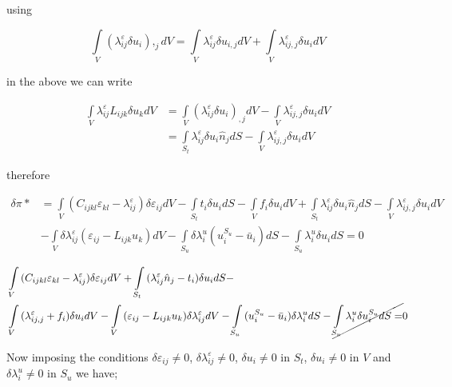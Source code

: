 using

\[\int\limits_V {(\lambda _{ij}^\varepsilon \delta {u_i}){,_j}dV = } \int\limits_V {\lambda _{ij}^\varepsilon \delta {u_{i,j}}dV}  + \int\limits_V {\lambda _{ij,j}^\varepsilon \delta {u_i}dV} \]

in the above we can write

\begin{align*}
\int\limits_V {\lambda _{ij}^\varepsilon {L_{ijk}}\delta {u_k}dV} & = \int\limits_V {{{(\lambda _{ij}^\varepsilon \delta {u_i})}_{,j}}dV}  - \int\limits_V {\lambda _{ij,j}^\varepsilon \delta {u_i}dV}\\
& = \int\limits_{{S_t}} {\lambda _{ij}^\varepsilon \delta {u_i}{{\hat n}_j}dS}  - \int\limits_V {\lambda _{ij,j}^\varepsilon \delta {u_i}dV}
\end{align*}

therefore


\begin{align*}
\delta \pi * &= \int\limits_V {({C_{ijkl}}{\varepsilon _{kl}} - \lambda _{ij}^\varepsilon )\delta {\varepsilon _{ij}}dV - \int\limits_{{S_t}} {{t_i}\delta {u_i}dS}  - \int\limits_V {{f_i}\delta {u_i}dV + } } \int\limits_{{S_t}} {\lambda _{ij}^\varepsilon \delta {u_i}{{\hat n}_j}dS}  - \int\limits_V {\lambda _{ij,j}^\varepsilon \delta {u_i}dV}\\
&- \int\limits_V {\delta \lambda _{ij}^\varepsilon ({\varepsilon _{ij}} - {L_{ijk}}{u_k})dV}  - \int\limits_{{S_u}} {\delta \lambda _i^u(u_i^{{S_u}} - {{\bar u}_i})dS}  - \int\limits_{{S_u}} {\lambda _i^u\delta {u_i}dS}  = 0
\end{align*}


\begin{align*}
&\int\limits_V {({C_{ijkl}}{\varepsilon _{kl}} - \lambda _{ij}^\varepsilon )\delta {\varepsilon _{ij}}dV
+ \int\limits_{{S_t}} {(\lambda _{ij}^\varepsilon {{\hat n}_j} - {t_i})\delta {u_i}dS}  - }\\
&\int\limits_V {(\lambda _{ij,j}^\varepsilon  + {f_i})\delta {u_i}dV}
- \int\limits_V {({\varepsilon _{ij}} - {L_{ijk}}{u_k})\delta \lambda _{ij}^\varepsilon dV}
- \int\limits_{{S_u}} {(u_i^{{S_u}} - {{\bar u}_i})\delta \lambda _i^udS}  - \cancel{\int\limits_{{S_u}} {\lambda _i^u\delta u_i^{{S_u}}dS} = } 0
\end{align*}


Now imposing the conditions $\delta {\varepsilon _{ij}} \neq 0$, $\delta \lambda _{ij}^\varepsilon  \neq 0$, $\delta {u_i} \neq 0$ in $S_t$, $\delta {u_i} \neq 0$ in $V$ and $\delta \lambda _i^u \neq 0$ in $S_u$ we have;

